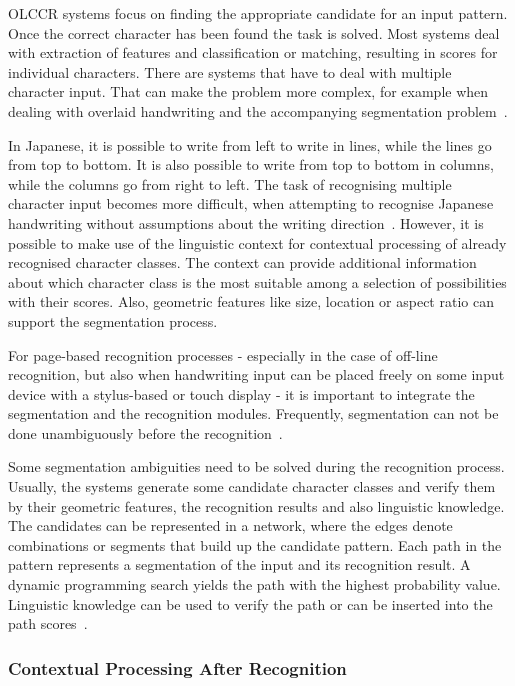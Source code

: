 OLCCR systems focus on finding the appropriate candidate for an input pattern.
Once the correct character has been found the task is solved. Most systems
deal with extraction of features and classification or matching, resulting in 
scores for individual characters. There are systems that have to deal with 
multiple character input. That can make the problem more complex, 
for example when dealing with overlaid handwriting and the accompanying 
segmentation problem~. 

In Japanese, it is possible to write from left to write in lines, 
while the lines go from top to bottom. It is also possible to write from top 
to bottom in columns, while the columns go from right to left. 
The task of recognising multiple character input becomes more difficult,
when attempting to recognise Japanese handwriting without assumptions about the
writing direction~. 
However, it is possible to make use of the linguistic context for contextual 
processing of already recognised character classes.
The context can provide additional information about which character class is
the most suitable among a selection of possibilities with their scores.
Also, geometric features like size, location or aspect ratio can support the 
segmentation process. 

For page-based recognition processes - especially in the case of off-line 
recognition, but also when handwriting input can be placed freely on some
input device with a stylus-based or touch display - it is important to integrate
the segmentation and the recognition modules. Frequently, segmentation can not
be done unambiguously before the recognition~.

Some segmentation ambiguities need to be solved during the recognition process.
Usually, the systems generate some candidate character classes and verify them
by their geometric features, the recognition results and also linguistic 
knowledge. The candidates can be represented in a network, where the edges denote
combinations or segments that build up the candidate pattern.
Each path in the pattern represents a segmentation of the input and its 
recognition result. A dynamic programming search yields the path with the highest
probability value. Linguistic knowledge can be used to verify the path or
can be inserted into the path scores~.

\subsubsection{Contextual Processing After Recognition}
\label{sec:olccr:contextualprocessingafter}

